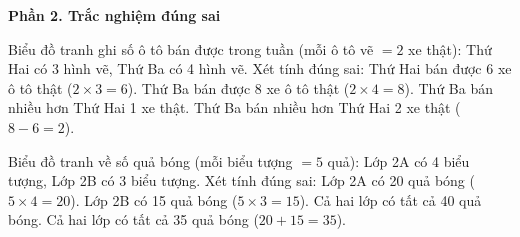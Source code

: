 \textbf{Phần 2. Trắc nghiệm đúng sai}

\begin{ex} %
Biểu đồ tranh ghi số ô tô bán được trong tuần (mỗi ô tô vẽ $= 2$ xe thật): Thứ Hai có 3 hình vẽ, Thứ Ba có 4 hình vẽ. Xét tính đúng sai:
\choiceTF
{\True Thứ Hai bán được 6 xe ô tô thật ($2 \times 3 = 6$).}
{\True Thứ Ba bán được 8 xe ô tô thật ($2 \times 4 = 8$).}
{Thứ Ba bán nhiều hơn Thứ Hai 1 xe thật.}
{\True Thứ Ba bán nhiều hơn Thứ Hai 2 xe thật ($8 - 6 = 2$).}
\end{ex}

\begin{ex} %
Biểu đồ tranh về số quả bóng (mỗi biểu tượng $= 5$ quả): Lớp 2A có 4 biểu tượng, Lớp 2B có 3 biểu tượng. Xét tính đúng sai:
\choiceTF
{\True Lớp 2A có 20 quả bóng ($5 \times 4 = 20$).}
{\True Lớp 2B có 15 quả bóng ($5 \times 3 = 15$).}
{Cả hai lớp có tất cả 40 quả bóng.}
{\True Cả hai lớp có tất cả 35 quả bóng ($20 + 15 = 35$).}
\end{ex}


